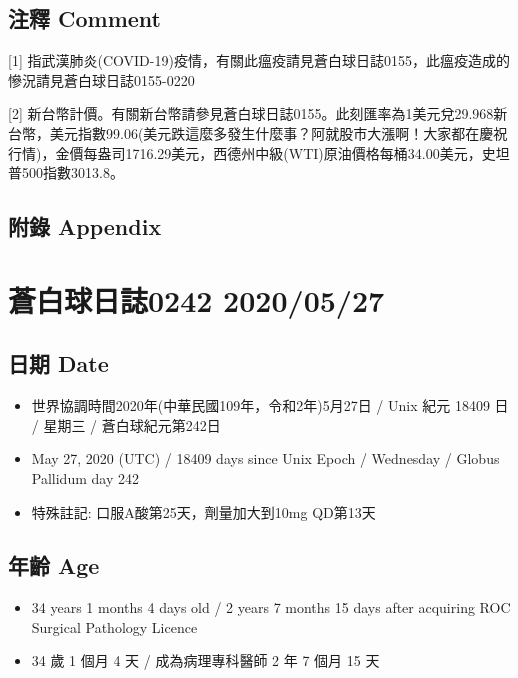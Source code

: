 \documentclass[a5paper, 12pt
]{book}
\providecommand{\tightlist}{%
  \setlength{\itemsep}{0pt}\setlength{\parskip}{0pt}}
\begin{document}
\hypertarget{ux6ce8ux91cb-comment-86}{%
\subsection{注釋 Comment}\label{ux6ce8ux91cb-comment-86}}

{[}1{]}
指武漢肺炎(COVID-19)疫情，有關此瘟疫請見蒼白球日誌0155，此瘟疫造成的慘況請見蒼白球日誌0155-0220

{[}2{]}
新台幣計價。有關新台幣請參見蒼白球日誌0155。此刻匯率為1美元兌29.968新台幣，美元指數99.06(美元跌這麼多發生什麼事？阿就股市大漲啊！大家都在慶祝行情)，金價每盎司1716.29美元，西德州中級(WTI)原油價格每桶34.00美元，史坦普500指數3013.8。

\hypertarget{ux9644ux9304-appendix-86}{%
\subsection{附錄 Appendix}\label{ux9644ux9304-appendix-86}}

\hypertarget{ux84bcux767dux7403ux65e5ux8a8c0242-20200527}{%
\section{蒼白球日誌0242
2020/05/27}\label{ux84bcux767dux7403ux65e5ux8a8c0242-20200527}}

\hypertarget{ux65e5ux671f-date-87}{%
\subsection{日期 Date}\label{ux65e5ux671f-date-87}}

\begin{itemize}
\tightlist
\item
  世界協調時間2020年(中華民國109年，令和2年)5月27日 / Unix 紀元 18409 日
  / 星期三 / 蒼白球紀元第242日
\item
  May 27, 2020 (UTC) / 18409 days since Unix Epoch / Wednesday / Globus
  Pallidum day 242
\item
  特殊註記: 口服A酸第25天，劑量加大到10mg QD第13天
\end{itemize}

\hypertarget{ux5e74ux9f61-age-87}{%
\subsection{年齡 Age}\label{ux5e74ux9f61-age-87}}

\begin{itemize}
\tightlist
\item
  34 years 1 months 4 days old / 2 years 7 months 15 days after
  acquiring ROC Surgical Pathology Licence
\item
  34 歲 1 個月 4 天 / 成為病理專科醫師 2 年 7 個月 15 天
\end{itemize}
\end{document}
